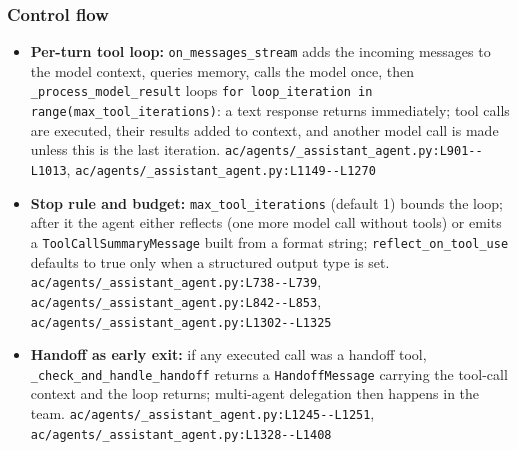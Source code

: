 \subsubsection*{Control flow}
\begin{itemize}
\item \textbf{Per-turn tool loop:} \texttt{on\_\allowbreak{}messages\_\allowbreak{}stream} adds the incoming messages to the model context, queries memory, calls the model once, then \texttt{\_\allowbreak{}process\_\allowbreak{}model\_\allowbreak{}result} loops \texttt{for loop\_\allowbreak{}iteration in range(\allowbreak{}max\_\allowbreak{}tool\_\allowbreak{}iterations)}: a text response returns immediately; tool calls are executed, their results added to context, and another model call is made unless this is the last iteration. \texttt{ac/\allowbreak{}agents/\allowbreak{}\_\allowbreak{}assistant\_\allowbreak{}agent.\allowbreak{}py:\allowbreak{}L901-\allowbreak{}-\allowbreak{}L1013}, \texttt{ac/\allowbreak{}agents/\allowbreak{}\_\allowbreak{}assistant\_\allowbreak{}agent.\allowbreak{}py:\allowbreak{}L1149-\allowbreak{}-\allowbreak{}L1270}
\item \textbf{Stop rule and budget:} \texttt{max\_\allowbreak{}tool\_\allowbreak{}iterations} (default 1) bounds the loop; after it the agent either reflects (one more model call without tools) or emits a \texttt{ToolCallSummaryMessage} built from a format string; \texttt{reflect\_\allowbreak{}on\_\allowbreak{}tool\_\allowbreak{}use} defaults to true only when a structured output type is set. \texttt{ac/\allowbreak{}agents/\allowbreak{}\_\allowbreak{}assistant\_\allowbreak{}agent.\allowbreak{}py:\allowbreak{}L738-\allowbreak{}-\allowbreak{}L739}, \texttt{ac/\allowbreak{}agents/\allowbreak{}\_\allowbreak{}assistant\_\allowbreak{}agent.\allowbreak{}py:\allowbreak{}L842-\allowbreak{}-\allowbreak{}L853}, \texttt{ac/\allowbreak{}agents/\allowbreak{}\_\allowbreak{}assistant\_\allowbreak{}agent.\allowbreak{}py:\allowbreak{}L1302-\allowbreak{}-\allowbreak{}L1325}
\item \textbf{Handoff as early exit:} if any executed call was a handoff tool, \texttt{\_\allowbreak{}check\_\allowbreak{}and\_\allowbreak{}handle\_\allowbreak{}handoff} returns a \texttt{HandoffMessage} carrying the tool-call context and the loop returns; multi-agent delegation then happens in the team. \texttt{ac/\allowbreak{}agents/\allowbreak{}\_\allowbreak{}assistant\_\allowbreak{}agent.\allowbreak{}py:\allowbreak{}L1245-\allowbreak{}-\allowbreak{}L1251}, \texttt{ac/\allowbreak{}agents/\allowbreak{}\_\allowbreak{}assistant\_\allowbreak{}agent.\allowbreak{}py:\allowbreak{}L1328-\allowbreak{}-\allowbreak{}L1408}

\end{itemize}
